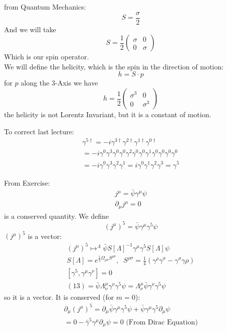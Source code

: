 \documentclass[]{scrartcl}
\begin{document}
from Quantum Mechanics:
\begin{equation}
	S = \frac{\sigma}{2}
\end{equation}
And we will take
\begin{equation}
	S = \frac{1}{2}
	\begin{pmatrix}
		\sigma & 0 \\
		0 & \sigma
	\end{pmatrix}
\end{equation}
Which is our spin operator.\\
We will define the helicity, which is the spin in the direction of motion:
$$
h = S\cdot p
$$
for $p$ along the 3-Axis we have
$$
h = \frac{1}{2}
\begin{pmatrix}
	\sigma^3 & 0\\
	0 & \sigma^3
\end{pmatrix}
$$
the helicity is not Lorentz Invariant, but it is a constant of motion.

To correct last lecture:
\begin{gather}
	\gamma^{5\dagger} = -i \gamma^{3\dagger}\gamma^{2\dagger}\gamma^{1\dagger}\gamma^{0\dagger}\\
	= -i \gamma^0\gamma^3\gamma^0\gamma^0\gamma^2\gamma^0\gamma^0\gamma^1\gamma^0\gamma^0\gamma^0\gamma^0\\
	= -i\gamma^0\gamma^3\gamma^2\gamma^1 = i\gamma^0\gamma^1\gamma^2\gamma^3 = \gamma^5
\end{gather}

From Exercise:
\begin{gather}
	j^\mu = \bar\psi\gamma^\mu\psi\\
	\partial_\mu j^\mu = 0
\end{gather}
is a conserved quantity. We define
$$
(j^\mu)^5 = \bar\psi \gamma^\mu\gamma^5\psi
$$
$(j^\mu)^5$ is a vector:
\begin{gather}
	(j^\mu)^5 \mapsto^\Lambda \bar\psi S[\Lambda]^{-1}\gamma^\mu\gamma^5 S[\Lambda]\psi\\
	S[\Lambda] = e^{\frac{1}{2} \Omega_{\rho\sigma}S^{\rho\sigma}},\;\; S^{\rho\sigma} = \frac{1}{4}(\gamma^\rho\gamma^\sigma - \gamma^\sigma\gamma\rho)\\
	[\gamma^5, \gamma^\mu\gamma^\nu] = 0\\
	(13) = \bar\psi \Lambda^\mu_\nu\gamma^\nu\gamma^5\psi = \Lambda^\mu_\nu \bar\psi\gamma^\nu\gamma^5\psi
\end{gather}
so it is a vector. It is conserved (for $m=0$):
\begin{gather}
	\partial_\mu (j^\mu)^5 = \partial_\mu\bar\psi\gamma^\mu\gamma^5\psi + \bar\psi\gamma^\mu\gamma^5\partial_\mu\psi\\
	= 0 - \bar\gamma^5\gamma^\mu\partial_\mu\psi = 0 \text{  (From Dirac Equation)}
\end{gather}
\end{document}
